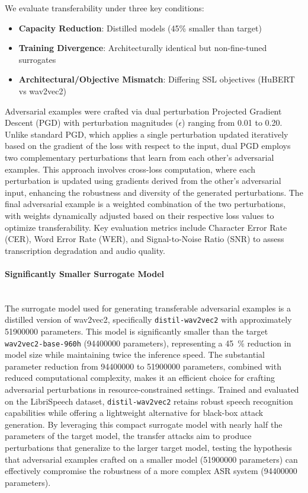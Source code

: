 \documentclass[../main.tex]{subfiles}
\begin{document}
We evaluate transferability under three key conditions:
\begin{itemize}
\item \textbf{Capacity Reduction}: Distilled models (45\% smaller than target)
\item \textbf{Training Divergence}: Architecturally identical but non-fine-tuned surrogates
\item \textbf{Architectural/Objective Mismatch}: Differing SSL objectives (HuBERT vs wav2vec2)
\end{itemize}

Adversarial examples were crafted via dual perturbation Projected Gradient Descent (PGD)\cite{zhang2024bag} with perturbation magnitudes (\(\epsilon\)) ranging from \num{0.01} to \num{0.20}. Unlike standard PGD, which applies a single perturbation updated iteratively based on the gradient of the loss with respect to the input, dual PGD employs two complementary perturbations that learn from each other’s adversarial examples. This approach involves cross-loss computation, where each perturbation is updated using gradients derived from the other’s adversarial input, enhancing the robustness and diversity of the generated perturbations. The final adversarial example is a weighted combination of the two perturbations, with weights dynamically adjusted based on their respective loss values to optimize transferability\cite{zhang2024bag}. Key evaluation metrics include Character Error Rate (CER), Word Error Rate (WER), and Signal-to-Noise Ratio (SNR) to assess transcription degradation and audio quality.


\paragraph{Significantly Smaller Surrogate Model}\leavevmode\\
The surrogate model used for generating transferable adversarial examples is a distilled version of wav2vec2, specifically \texttt{distil-wav2vec2} with approximately \num{51900000} parameters. This model is significantly smaller than the target \texttt{wav2vec2-base-960h} (\num{94400000} parameters), representing a \SI{45}{\percent} reduction in model size while maintaining twice the inference speed. The substantial parameter reduction from \num{94400000} to \num{51900000} parameters, combined with reduced computational complexity, makes it an efficient choice for crafting adversarial perturbations in resource-constrained settings. Trained and evaluated on the LibriSpeech dataset, \texttt{distil-wav2vec2} retains robust speech recognition capabilities while offering a lightweight alternative for black-box attack generation. By leveraging this compact surrogate model with nearly half the parameters of the target model, the transfer attacks aim to produce perturbations that generalize to the larger target model, testing the hypothesis that adversarial examples crafted on a smaller model (\num{51900000} parameters) can effectively compromise the robustness of a more complex ASR system (\num{94400000} parameters).
\end{document}
